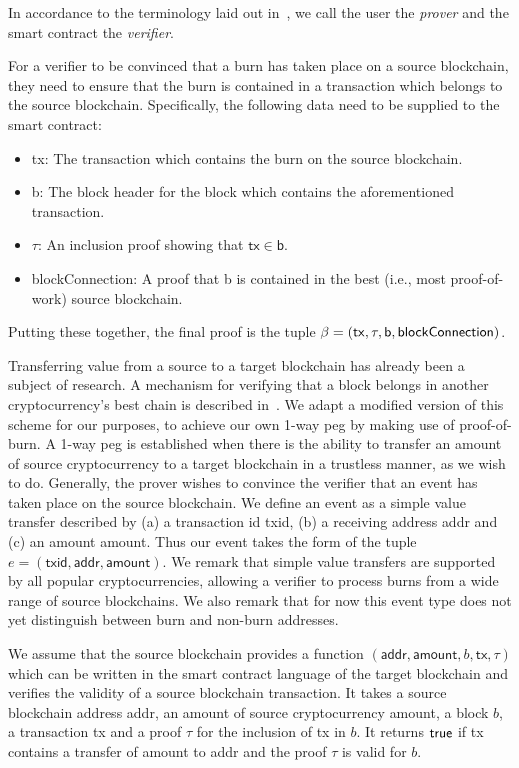 In accordance to the terminology laid out in~\cite{pow-sidechains}, we call the user the \emph{prover} and the smart contract the \emph{verifier}.

For a verifier to be convinced that a burn has taken place on a source blockchain, they need to ensure that the burn is contained in a transaction which belongs to the source blockchain. Specifically, the following data need to be supplied to the smart contract:

\begin{itemize}
  \item \textsf{tx}: The transaction which contains the burn on the source blockchain.
  \item \textsf{b}: The block header for the block which contains the aforementioned transaction.
  \item $\tau$: An inclusion proof showing that $\mathsf{tx} \in \mathsf{b}$.
  \item \textsf{blockConnection}: A proof that \textsf{b} is contained in the best (i.e., most proof-of-work) source blockchain.
\end{itemize}

Putting these together, the final proof is the tuple $\beta = \sf(tx, \tau, b, block\-Connection)$.

Transferring value from a source to a target blockchain has already been a subject of research. A mechanism for verifying that a block belongs in another cryptocurrency's best chain is described in~\cite{pow-sidechains}. We adapt a modified version of this scheme for our purposes, to achieve our own 1-way peg by making use of proof-of-burn. A 1-way peg is established when there is the ability to transfer an amount of source cryptocurrency to a target blockchain in a trustless manner, as we wish to do. Generally, the prover wishes to convince the verifier that an event has taken place on the source blockchain. We define an event as a simple value transfer described by (a) a transaction id \textsf{txid}, (b) a receiving address \textsf{addr} and (c) an amount \textsf{amount}. Thus our event takes the form of the tuple $e = (\textsf{txid}, \textsf{addr}, \textsf{amount})$. We remark that simple value transfers are supported by all popular cryptocurrencies, allowing a verifier to process burns from a wide range of source blockchains. We also remark that for now this event type does not yet distinguish between burn and non-burn addresses.

We assume that the source blockchain provides a function \verifytx$(\textsf{addr}, \textsf{amount}, b, \textsf{tx}, \tau)$ which can be written in the smart contract language of the target blockchain and verifies the validity of a source blockchain transaction. It takes a source blockchain address \textsf{addr}, an amount of source cryptocurrency \textsf{amount}, a block $b$, a transaction \textsf{tx} and a proof $\tau$ for the inclusion of \textsf{tx} in $b$. It returns $\mathsf{true}$ if \textsf{tx} contains a transfer of \textsf{amount} to \textsf{addr} and the proof $\tau$ is valid for $b$.

